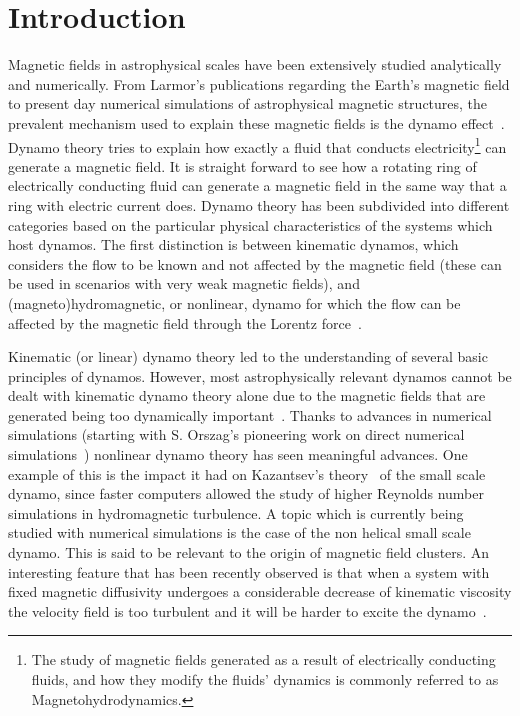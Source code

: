 \documentclass[12pt,a4paper]{report}
\begin{document}

\chapter{Introduction}

Magnetic fields in astrophysical scales have been extensively studied analytically and numerically. From Larmor's publications regarding the Earth's magnetic field to present day numerical simulations of astrophysical magnetic structures, the prevalent mechanism used to explain these magnetic fields is the dynamo effect~\cite{sir1919larmor}. Dynamo theory tries to explain how exactly a fluid that conducts electricity\footnote{The study of magnetic fields generated as a result of electrically conducting fluids, and how they modify the fluids' dynamics is commonly referred to as Magnetohydrodynamics.} can generate a magnetic field. It is straight forward to see how a rotating ring of electrically conducting fluid can generate a magnetic field in the same way that a ring with electric current does. Dynamo theory has been subdivided into different categories based on the particular physical characteristics of the systems which host dynamos. The first distinction is between kinematic dynamos, which considers the flow to be known and not affected by the magnetic field (these can be used in scenarios with very weak magnetic fields), and (magneto)hydromagnetic, or nonlinear, dynamo for which the flow can be affected by the magnetic field through the Lorentz force~\cite{brandenburg2007hydromagnetic}.

Kinematic (or linear) dynamo theory led to the understanding of several basic principles of dynamos. However, most astrophysically relevant dynamos cannot be dealt with kinematic dynamo theory alone due to the magnetic fields that are generated being too dynamically important~\cite{brandenburg2005astrophysical}. Thanks to advances in numerical simulations (starting with S. Orszag's pioneering work on direct numerical simulations~\cite{orszag1970analytical}) nonlinear dynamo theory has seen meaningful advances. One example of this is the impact it had on Kazantsev's theory~\cite{kazantsev1968enhancement} of the small scale dynamo, since faster computers allowed the study of higher Reynolds number simulations in hydromagnetic turbulence. A topic which is currently being studied with numerical simulations is the case of the non helical small scale dynamo. This is said to be relevant to the origin of magnetic field clusters. An interesting feature that has been recently observed is that when a system with fixed magnetic diffusivity undergoes a considerable decrease of kinematic viscosity the velocity field is too turbulent and it will be harder to excite the dynamo~\cite{schekochihin2004critical}. 
\end{document}
